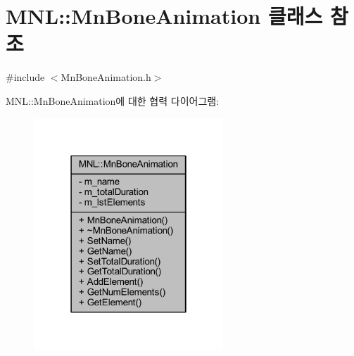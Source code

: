 \hypertarget{class_m_n_l_1_1_mn_bone_animation}{}\section{M\+NL\+:\+:Mn\+Bone\+Animation 클래스 참조}
\label{class_m_n_l_1_1_mn_bone_animation}


{\ttfamily \#include $<$Mn\+Bone\+Animation.\+h$>$}



M\+NL\+:\+:Mn\+Bone\+Animation에 대한 협력 다이어그램\+:\nopagebreak
\begin{figure}[H]
\begin{center}
\leavevmode
\includegraphics[width=202pt]{class_m_n_l_1_1_mn_bone_animation__coll__graph}
\end{center}
\end{figure}
